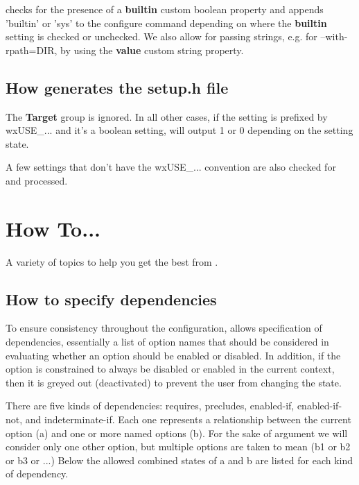 \ctshortname checks for the presence of a
{\bf builtin} custom boolean property and appends 'builtin' or
'sys' to the configure command depending on where
the {\bf builtin} setting is checked or unchecked.
We also allow for passing strings, e.g. for --with-rpath=DIR,
by using the {\bf value} custom string property.

\section{How \ctshortname generates the setup.h file}

The {\bf Target} group is ignored. In all other
cases, if the setting is prefixed by wxUSE_...
and it's a boolean setting, \ctshortname will
output 1 or 0 depending on the setting state.

A few settings that don't have the wxUSE_...
convention are also checked for and processed.


\chapter{How To...}\label{howto}%
%
\setfooter{\thepage}{}{}{}{}{\thepage}%

A variety of topics to help you get the best from \ctshortname.

\section{How to specify dependencies}\label{dependencies}

To ensure consistency throughout the configuration,
\ctshortname allows specification of dependencies, essentially
a list of option names that should be considered in evaluating
whether an option should be enabled or disabled. In addition,
if the option is constrained to always be disabled
or enabled in the current context, then it is greyed out
(deactivated) to prevent the user from changing the state.

There are five kinds of dependencies: requires, precludes,
enabled-if, enabled-if-not, and indeterminate-if. Each one represents a
relationship between the current option (a) and one
or more named options (b). For the sake of argument
we will consider only one other option, but multiple
options are taken to mean (b1 or b2 or b3 or ...)
Below the allowed combined states of a and b are
listed for each kind of dependency.

